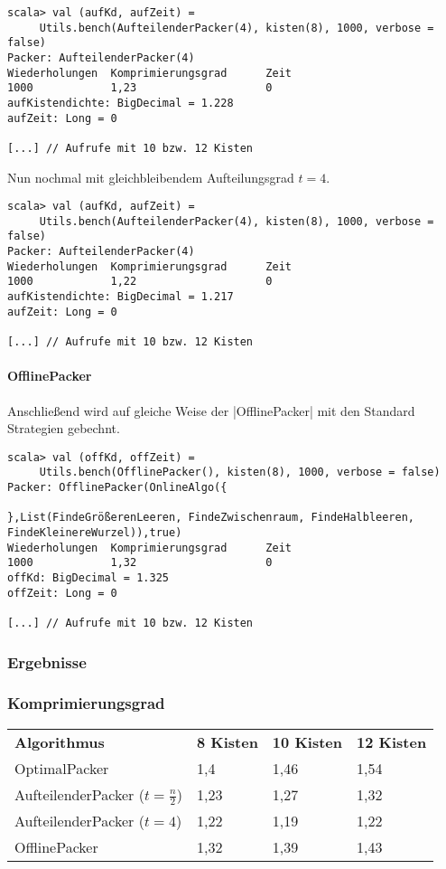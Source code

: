 \begin{lstlisting}
scala> val (aufKd, aufZeit) =
	 Utils.bench(AufteilenderPacker(4), kisten(8), 1000, verbose = false)
Packer: AufteilenderPacker(4)
Wiederholungen  Komprimierungsgrad      Zeit
1000            1,23                    0
aufKistendichte: BigDecimal = 1.228
aufZeit: Long = 0

[...] // Aufrufe mit 10 bzw. 12 Kisten
\end{lstlisting}
Nun nochmal mit gleichbleibendem Aufteilungsgrad $t=4$.

\begin{lstlisting}
scala> val (aufKd, aufZeit) =
	 Utils.bench(AufteilenderPacker(4), kisten(8), 1000, verbose = false) 
Packer: AufteilenderPacker(4)
Wiederholungen  Komprimierungsgrad      Zeit
1000            1,22                    0
aufKistendichte: BigDecimal = 1.217
aufZeit: Long = 0

[...] // Aufrufe mit 10 bzw. 12 Kisten
\end{lstlisting}
\paragraph{OfflinePacker}
Anschließend wird auf gleiche Weise der |OfflinePacker| mit den Standard Strategien gebechnt.
\begin{lstlisting}
scala> val (offKd, offZeit) =
	 Utils.bench(OfflinePacker(), kisten(8), 1000, verbose = false)
Packer: OfflinePacker(OnlineAlgo({

},List(FindeGrößerenLeeren, FindeZwischenraum, FindeHalbleeren, FindeKleinereWurzel)),true)
Wiederholungen  Komprimierungsgrad      Zeit
1000            1,32                    0
offKd: BigDecimal = 1.325
offZeit: Long = 0

[...] // Aufrufe mit 10 bzw. 12 Kisten
\end{lstlisting}
\subsubsection{Ergebnisse}
\subsubsection*{Komprimierungsgrad}
\begin{tabular}{llll}
\textbf{Algorithmus} 	& \textbf{8 Kisten} 	& \textbf{10 Kisten} 	& \textbf{12 Kisten} 	\\
 OptimalPacker       	& 1,4               	& 1,46              	& 1,54               	\\
 AufteilenderPacker ($t=\frac{n}{2}$)  	& 1,23	& 1,27			& 1,32			\\
 AufteilenderPacker ($t=4$)	 	& 1,22	& 1,19			& 1,22			\\
 OfflinePacker		& 1,32			& 1,39			& 1,43			\\
\end{tabular}
